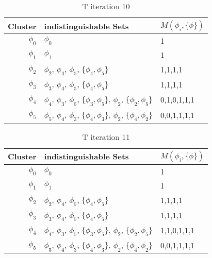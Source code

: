 \documentclass{article}
\begin{document}
				\begin{table}[h!]
				  \begin{center}
				    \caption{T iteration 10}
				    \label{tab:table12}
				    \begin{tabular}{r|l|l}
				      Cluster & indistinguishable Sets & $M(\phi_i, \{\phi\})$\\
				      \hline
				      $\phi_0$ & $\phi_0$ & 1\\
				      $\phi_1$ & $\phi_1$ & 1\\
				      $\phi_2$ & $\phi_2$, $\phi_4$, $\phi_5$, $\{\phi_4,\phi_5\}$ & 1,1,1,1\\
				      $\phi_3$ & $\phi_3$, $\phi_4$, $\phi_5$, $\{\phi_4,\phi_5\}$ & 1,1,1,1\\
				      $\phi_4$ & $\phi_4$, $\phi_3$, $\phi_5$, $\{\phi_3,\phi_5\}$, $\phi_2$, $\{\phi_2,\phi_5\}$ & 0,1,0,1,1,1\\
				      $\phi_5$ & $\phi_5$, $\phi_4$, $\phi_3$, $\{\phi_4,\phi_3\}$, $\phi_2$, $\{\phi_4,\phi_2\}$ & 0,0,1,1,1,1\\
				    \end{tabular}
				  \end{center}
				\end{table}

				\begin{table}[h!]
				  \begin{center}
				    \caption{T iteration 11}
				    \label{tab:table13}
				    \begin{tabular}{r|l|l}
				      Cluster & indistinguishable Sets & $M(\phi_i, \{\phi\})$\\
				      \hline
				      $\phi_0$ & $\phi_0$ & 1\\
				      $\phi_1$ & $\phi_1$ & 1\\
				      $\phi_2$ & $\phi_2$, $\phi_4$, $\phi_5$, $\{\phi_4,\phi_5\}$ & 1,1,1,1\\
				      $\phi_3$ & $\phi_3$, $\phi_4$, $\phi_5$, $\{\phi_4,\phi_5\}$ & 1,1,1,1\\
				      $\phi_4$ & $\phi_4$, $\phi_3$, $\phi_5$, $\{\phi_3,\phi_5\}$, $\phi_2$, $\{\phi_2,\phi_5\}$ & 1,1,0,1,1,1\\
				      $\phi_5$ & $\phi_5$, $\phi_4$, $\phi_3$, $\{\phi_4,\phi_3\}$, $\phi_2$, $\{\phi_4,\phi_2\}$ & 0,0,1,1,1,1\\
				    \end{tabular}
				  \end{center}
				\end{table}
\end{document}
